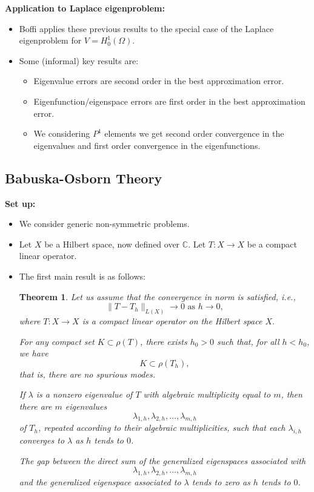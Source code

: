 \documentclass[12pt,a4paper]{article}
\theoremstyle{boldthm}
\newtheorem{theorem}{Theorem}[section]
\theoremstyle{bolddefn}
\begin{document}
\textbf{Application to Laplace eigenproblem:}
\begin{itemize}
\item Boffi applies these previous results to the special case of the Laplace eigenproblem for $V = H_0^1(\Omega).$
\item Some (informal) key results are:
\begin{itemize}
    \item Eigenvalue errors are second order in the best approximation error.
    \item Eigenfunction/eigenspace errors are first order in the best approximation error.
    \item We considering $P^1$ elements we get second order convergence in the eigenvalues and first order convergence in the eigenfunctions.
\end{itemize}
\end{itemize}


\subsection{Babuska-Osborn Theory}

\textbf{Set up:}

\begin{itemize}
    \item We consider generic non-symmetric problems.
    \item Let $X$ be a Hilbert space, now defined over $\mathbb{C}.$ Let $T:X \rightarrow X$ be a compact linear operator. 
    \item The first main result is as follows:
    \begin{theorem}
    Let us assume that the convergence in norm is satisfied, i.e., 
    $$\|T - T_h\|_{L(X)} \rightarrow 0 \text{ as } h \rightarrow 0,$$
    where $T:X \rightarrow X$ is a compact linear operator on the Hilbert space $X.$
    
    For any compact set $K\subset \rho(T)$, there exists $h_0>0$ such that, for all $h<h_0$, we have
    $$
    K\subset \rho(T_h),
    $$
    that is, there are no spurious modes.
    
    If $\lambda$ is a nonzero eigenvalue of $T$ with algebraic multiplicity equal to $m$, then there are $m$ eigenvalues
    $$
    \lambda_{1,h},\lambda_{2,h},\ldots,\lambda_{m,h}
    $$
    of $T_h$, repeated according to their algebraic multiplicities, such that each $\lambda_{i,h}$ converges to $\lambda$ as $h$ tends to $0$.
    
    The gap between the direct sum of the generalized eigenspaces associated with
    $$
    \lambda_{1,h},\lambda_{2,h},\ldots,\lambda_{m,h}
    $$
    and the generalized eigenspace associated to $\lambda$ tends to zero as $h$ tends to $0$.
    \end{theorem}
\end{itemize}
\end{document}

